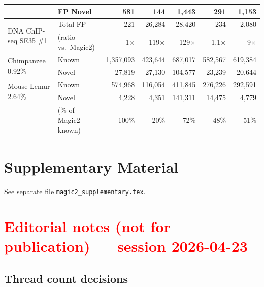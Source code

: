 \documentclass[11pt]{article}
\begin{document}
\begin{table}[h]
\begin{tabular}{llrrrrr}
& FP Novel &      581  &       144 &     1,443 &       291 &     1,153 \\
\midrule
\multirow{2}{*}{DNA ChIP-seq SE35 \#1} &
  Total FP &     221  &    26,284 &    28,420 &       234 &     2,080 \\
& (ratio vs.\ Magic2) & 1$\times$ & 119$\times$ & 129$\times$ & 1.1$\times$ & 9$\times$ \\
\midrule
\multirow{2}{*}{Chimpanzee 0.92\%} &
  Known   & 1,357,093 &   423,644 &   687,017 &   582,567 &   619,384 \\
& Novel   &    27,819 &    27,130 &   104,577 &    23,239 &    20,644 \\
\midrule
\multirow{2}{*}{Mouse Lemur 2.64\%} &
  Known   &   574,968 &   116,054 &   411,845 &   276,226 &   292,591 \\
& Novel   &     4,228 &     4,351 &   141,311 &    14,475 &     4,779 \\
& (\% of Magic2 known) & 100\% & 20\% & 72\% & 48\% & 51\% \\
\bottomrule
\end{tabular}
\end{table}

\clearpage
\appendix

\section*{Supplementary Material}
See separate file \texttt{magic2\_supplementary.tex}.


\clearpage
\section*{\textcolor{red}{Editorial notes (not for publication) —
  session 2026-04-23}}

\subsection*{Thread count decisions}
\end{document}
